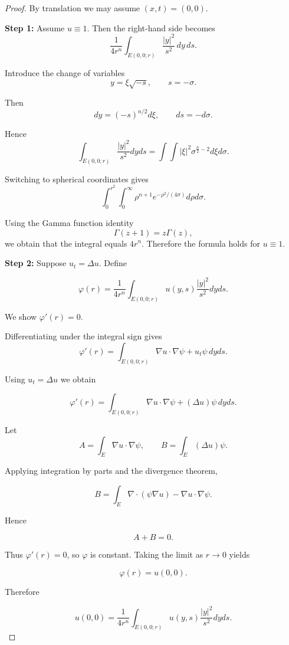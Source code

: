 \documentclass{article}
\begin{document}
\begin{proof}

By translation we may assume $(x,t)=(0,0)$.

\textbf{Step 1:} Assume $u \equiv 1$. Then the right-hand side becomes
\[
\frac{1}{4r^n}\int_{E(0,0;r)} \frac{|y|^2}{s^2}\, dy\, ds .
\]

Introduce the change of variables
\[
y = \xi \sqrt{-s}, \qquad s = -\sigma .
\]

Then
\[
dy = (-s)^{n/2} d\xi, \qquad ds = -d\sigma .
\]

Hence
\[
\int_{E(0,0;r)} \frac{|y|^2}{s^2} dy ds
=
\int \int |\xi|^2 \sigma^{\frac{n}{2}-2} d\xi d\sigma .
\]

Switching to spherical coordinates gives
\[
\int_0^{r^2} \int_0^\infty
\rho^{n+1} e^{-\rho^2/(4\sigma)} d\rho d\sigma .
\]

Using the Gamma function identity
\[
\Gamma(z+1) = z\Gamma(z),
\]
we obtain that the integral equals $4r^n$. Therefore the formula holds for $u\equiv 1$.

\medskip

\textbf{Step 2:} Suppose $u_t = \Delta u$. Define

\[
\varphi(r) =
\frac{1}{4r^n}
\int_{E(0,0;r)}
u(y,s)\frac{|y|^2}{s^2} dy ds .
\]

We show $\varphi'(r)=0$.

Differentiating under the integral sign gives
\[
\varphi'(r)
=
\int_{E(0,0;r)}
\nabla u \cdot \nabla \psi
+
u_t \psi
\, dy ds .
\]

Using $u_t=\Delta u$ we obtain

\[
\varphi'(r)
=
\int_{E(0,0;r)}
\nabla u \cdot \nabla \psi
+
(\Delta u)\psi
\, dy ds .
\]

Let
\[
A = \int_{E} \nabla u \cdot \nabla \psi,
\qquad
B = \int_E (\Delta u)\psi .
\]

Applying integration by parts and the divergence theorem,

\[
B
=
\int_E \nabla \cdot (\psi \nabla u) - \nabla u \cdot \nabla \psi .
\]

Hence

\[
A + B = 0 .
\]

Thus $\varphi'(r)=0$, so $\varphi$ is constant. Taking the limit as $r\to0$ yields

\[
\varphi(r) = u(0,0).
\]

Therefore

\[
u(0,0)
=
\frac{1}{4r^n}
\int_{E(0,0;r)}
u(y,s)\frac{|y|^2}{s^2} dy ds .
\]

\end{proof}
\end{document}
